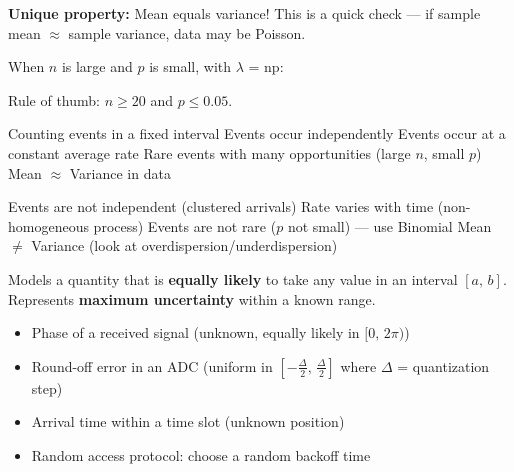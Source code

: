 





\textbf{Unique property:} Mean equals variance! This is a quick check — if sample mean \ensuremath{\approx} sample variance, data may be Poisson.


When $n$ is large and $p$ is small, with $\lambda$ = np:


Rule of thumb: $n \ge 20$ and $p \le 0.05$.


\PSyes{} Counting events in a fixed interval\PSbr{}\PSyes{} Events occur independently\PSbr{}\PSyes{} Events occur at a constant average rate\PSbr{}\PSyes{} Rare events with many opportunities (large $n$, small $p$)\PSbr{}\PSyes{} Mean \ensuremath{\approx} Variance in data


\PSno{} Events are not independent (clustered arrivals)\PSbr{}\PSno{} Rate varies with time (non-homogeneous process)\PSbr{}\PSno{} Events are not rare ($p$ not small) — use Binomial\PSbr{}\PSno{} Mean \ensuremath{\neq} Variance (look at overdispersion/underdispersion)



Models a quantity that is \textbf{equally likely} to take any value in an interval $[a,\, b]$. Represents \textbf{maximum uncertainty} within a known range.


\begin{itemize}
\tightlist
\item
  Phase of a received signal (unknown, equally likely in $[0,\, 2\pi)$)
\item
  Round-off error in an ADC (uniform in $\left[-\frac{\Delta}{2},\, \frac{\Delta}{2}\right]$ where $\Delta$ = quantization step)
\item
  Arrival time within a time slot (unknown position)
\item
  Random access protocol: choose a random backoff time
\end{itemize}

